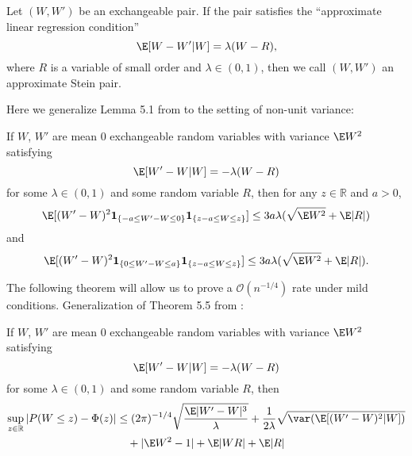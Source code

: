 \begin{definition}
  Let $(W, W')$ be an exchangeable pair.  If the pair satisfies the ``approximate linear
  regression condition''
  \begin{equation}
    \label{D:approx-stein-pair}
    \E [W - W' | W] = \lambda (W - R),
  \end{equation}
  where $R$ is a variable of small order and $\lambda \in (0, 1)$, then we call $(W, W')$ an
  approximate Stein pair.
\end{definition}

Here we generalize Lemma 5.1 from \cite{chen2010normal} to the setting of non-unit variance:
\begin{theorem}
  \label{L:stein-difference-second-moment-generalization-bound}
  If $W$, $W'$ are mean 0 exchangeable random variables with variance $\E W^2$
  satisfying
  \begin{equation*}
    \E[W'-W|W] = -\lambda(W-R)
  \end{equation*}
  for some $\lambda \in (0,1)$ and some random variable $R$, then for any
  $z \in \mathbb{R}$ and $a > 0$,
  \begin{equation*}
    \E [(W'-W)^2 \mathbf{1}_{\{-a \leq W' - W \leq 0\}} \mathbf{1}_{\{z-a \leq W \leq z\}}] \leq
    3a \lambda (\sqrt{\E W^2} + \E |R|)
  \end{equation*}
  and
  \begin{equation*}
    \E [(W'-W)^2 \mathbf{1}_{\{0 \leq W' - W \leq a\}} \mathbf{1}_{\{z-a \leq W \leq z\}}] \leq
        3a \lambda (\sqrt{\E W^2} + \E |R|).
  \end{equation*}
\end{theorem}

The following theorem will allow us to prove a $\mathcal{O}(n^{-1/4})$ rate under
mild conditions.  Generalization of Theorem 5.5 from \cite{chen2010normal}:
\begin{theorem}
  \label{T:main}
  If $W$, $W'$ are mean 0 exchangeable random variables with variance
  $\E W^2$
  satisfying
  \begin{equation*}
    \label{eq:13}
    \E[W'-W|W] = -\lambda(W-R)
  \end{equation*}
  for some $\lambda \in (0,1)$ and some random variable $R$, then
  \begin{equation*}
    \begin{split}
      \sup_{z \in \mathbb{R}} |P(W \leq z) - \Phi(z)|
      &\leq (2\pi)^{-1/4} \sqrt{\frac{\E |W'-W|^3}{\lambda}}
      + \frac{1}{2\lambda} \sqrt{\var (\E [(W'-W)^2|W])} \\
      &\quad + |\E W^2 - 1| + \E |WR| + \E |R|
    \end{split}
  \end{equation*}
\end{theorem}

